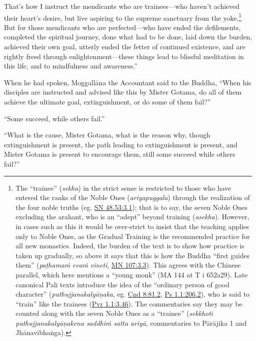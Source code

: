 \documentclass[12pt,openany]{book}%
\begin{document}
That’s how I instruct the mendicants who are trainees—who haven’t achieved their heart’s desire, but live aspiring to the supreme sanctuary from the yoke.\footnote{The “trainee” (\textit{sekha}) in the strict sense is restricted to those who have entered the ranks of the Noble Ones (\textit{ariyapuggala}) through the realization of the four noble truths (eg. \href{https://suttacentral.net/sn48.53/en/sujato\#3.1}{SN 48.53:3.1}); that is to say, the seven Noble Ones excluding the arahant, who is an “adept” beyond training (\textit{asekha}). However, in cases such as this it would be over-strict to insist that the teaching applies only to Noble Ones, as the Gradual Training is the recommended practice for all new monastics. Indeed, the burden of the text is to show how practice is taken up gradually, so above it says that this is how the Buddha “first guides them” (\textit{\textsanskrit{paṭhamaṁ} \textsanskrit{evaṁ} vineti}, \href{https://suttacentral.net/mn107/en/sujato\#3.3}{MN 107:3.3}). This agrees with the Chinese parallel, which here mentions a “young monk” (MA 144 at T i 652a29). Late canonical Pali texts introduce the idea of the “ordinary person of good character” (\textit{\textsanskrit{puthujjanakalyāṇaka}}, eg. \href{https://suttacentral.net/cnd8/en/sujato\#81.2}{Cnd 8:81.2}, \href{https://suttacentral.net/ps1.1/en/sujato\#206.2}{Ps 1.1:206.2}), who is said to “train” like the trainees (\href{https://suttacentral.net/pli-tv-pvr1.1/en/sujato\#3.46}{Pvr 1.1:3.46}). The commentaries say they may be counted along with the seven Noble Ones as a “trainee” (\textit{sekkhoti \textsanskrit{puthujjanakalyāṇakena} \textsanskrit{saddhiṁ} satta \textsanskrit{ariyā}}, commentaries to \textsanskrit{Pārājika} 1 and \textsanskrit{Jhānavibhaṅga}). } But for those mendicants who are perfected—who have ended the defilements, completed the spiritual journey, done what had to be done, laid down the burden, achieved their own goal, utterly ended the fetter of continued existence, and are rightly freed through enlightenment—these things lead to blissful meditation in this life, and to mindfulness and awareness.” 

When he had spoken, \textsanskrit{Moggallāna} the Accountant said to the Buddha, “When his disciples are instructed and advised like this by Mister Gotama, do all of them achieve the ultimate goal, extinguishment, or do some of them fail?” 

“Some succeed, while others fail.” 

“What is the cause, Mister Gotama, what is the reason why, though extinguishment is present, the path leading to extinguishment is present, and Mister Gotama is present to encourage them, still some succeed while others fail?” 
\end{document}
